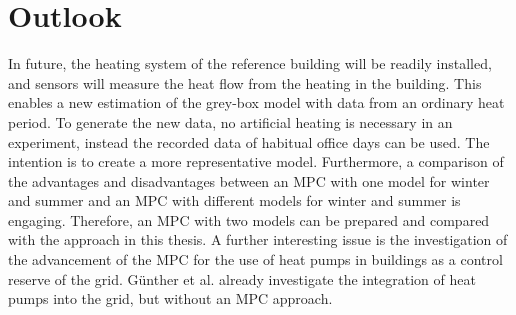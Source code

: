 \section{Outlook}
\label{sec:outlook}
In future, the heating system of the reference building will be readily installed, and sensors will measure the heat flow from the heating in the building. This enables a new estimation of the grey-box model with data from an ordinary heat period. To generate the new data, no artificial heating is necessary in an experiment, instead the recorded data of habitual office days can be used. The intention is to create a more representative model.\newline
Furthermore, a comparison of the advantages and disadvantages between an MPC with one model for winter and summer and an MPC with different models for winter and summer is engaging. Therefore, an MPC with two models can be prepared and compared with the approach in this thesis.\newline
A further interesting issue is the investigation of the advancement of the MPC for the use of heat pumps in buildings as a control reserve of the grid. Günther et al. \cite{WPimBestand.2020} already investigate the integration of heat pumps into the grid, but without an MPC approach. 



%
